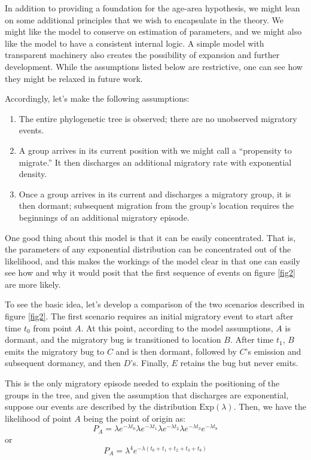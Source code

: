 \documentclass[11pt]{article}
\begin{document}
In addition to providing a foundation for the age-area hypothesis, we might lean on some additional principles that we wish to encapsulate in the theory. We might like the model to conserve on estimation of parameters, and we might also like the model to have a consistent internal logic. A simple model with transparent machinery also creates the possibility of expansion and further development. While the assumptions listed below are restrictive, one can see how they might be relaxed in future work.

Accordingly, let's make the following assumptions:
\begin{enumerate}
\item The entire phylogenetic tree is observed; there are no unobserved migratory events.
\item A group arrives in its current position with we might call a ``propensity to migrate.'' It then discharges an additional migratory rate with exponential density.
\item Once a group arrives in its current and discharges a migratory group, it is then dormant; subsequent migration from the group's location requires the beginnings of an additional migratory episode.
\end{enumerate}

One good thing about this model is that it can be easily concentrated. That is, the parameters of any exponential distribution can be concentrated out of the likelihood, and this makes the workings of the model clear in that one can easily see how and why it would posit that the first sequence of events on figure \ref{fig2} are more likely.

To see the basic idea, let's develop a comparison of the two scenarios described in figure \ref{fig2}. The first scenario requires an initial migratory event to start after time $t_0$ from point $A$. At this point, according to the model assumptions, $A$ is dormant, and the migratory bug is transitioned to location $B$. After time $t_1$, $B$ emits the migratory bug to $C$ and is then dormant, followed by $C$'s emission and subsequent dormancy, and then $D$'s. Finally, $E$ retains the bug but never emits.

This is the only migratory episode needed to explain the positioning of the groups in the tree, and given the assumption that discharges are exponential, suppose our events are described by the distribution $\textrm{Exp}(\lambda)$. Then, we have the likelihood of point $A$ being the point of origin as:
\begin{equation} \label{e1}
P_A = \lambda e^{-\lambda t_0}\lambda e^{-\lambda t_1}\lambda e^{-\lambda t_2}\lambda e^{-\lambda t_3}e^{-\lambda t_8}
\end{equation}
or
\begin{equation} \label{e2}
P_A = \lambda^4 e^{-\lambda (t_0+t_1+t_2+t_3+t_8)}
\end{equation}
\end{document}
